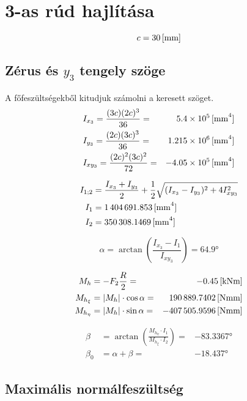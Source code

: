 \section{3-as rúd hajlítása}

\begin{equation*}
	c = \siunit{30}{\mm}
\end{equation*}

\subsection{Zérus és $y_3$ tengely szöge}
A főfeszültségekből kitudjuk számolni a keresett szöget.
\begin{align*}
	&I_{x_3} = \frac{(3c)(2c)^3}{36} = &\siunit{5.4e5}{\mm^4} \\
	&I_{y_3} = \frac{(2c)(3c)^3}{36} = &\siunit{1.215e6}{mm^4}\\
	&I_{xy_3} = \frac{(2c)^2(3c)^2}{72} = &\siunit{-4.05e5}{mm^4}
\end{align*}

\begin{align*}
	I_{1;2} &= \frac{I_{x_3} + I_{y_3}}{2} + \frac{1}{2}\sqrt{(I_{x_3} - I_{y_3})^2 +4I_{xy_3}^2} \\
	I_1 &= \siunit{1404691,853}{\mm^4} \\
	I_2 &= \siunit{350308.1469}{\mm^4}
\end{align*}

\begin{equation*}
	\alpha = \arctan\left(\frac{I_{x_3} - I_1}{I_{xy_3}}\right) = \ang{64.9}
\end{equation*}

\begin{align*}
	M_h &= - F_2 \frac{R}{2} = &\knm{-0.45} \\
	M_{h_\xi} &= \left|M_h\right|\cdot \cos\alpha = &\nmm{190889.7402} \\
	M_{h_\eta} &= \left|M_h\right|\cdot \sin\alpha = &\nmm{-407505.9596} \\
\end{align*}

\begin{align*}
	\beta &= \arctan\left(\frac{M_{h_\eta}\cdot I_1}{M_{h_\xi}\cdot I_2}\right) = &\ang{-83.3367} \\
	\beta_0 &= \alpha + \beta = &\ang{-18.437}
\end{align*}

\subsection{Maximális normálfeszültség}

